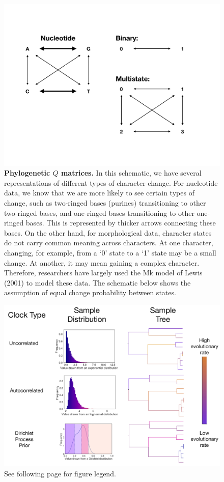 \documentclass[11pt]{article}
\begin{document}
\clearpage

\begin{figure}[h!]
\centering
\includegraphics[width=\textwidth]{figures/Q.pdf}
\caption{\textbf{Phylogenetic $Q$ matrices.}
In this schematic, we have several representations of different types of character change.
For nucleotide data, we know that we are more likely to see certain types of change, such as two-ringed bases (purines) transitioning to other two-ringed bases, and one-ringed bases transitioning to other one-ringed bases.
This is represented by thicker arrows connecting these bases.
On the other hand, for morphological data, character states do not carry common meaning across characters.
At one character, changing, for example, from a `0' state to a `1' state may be a small change.
At another, it may mean gaining a complex character.
Therefore, researchers have largely used the Mk model of Lewis (2001) to model these data.
The schematic below shows the assumption of equal change probability between states.
}
\label{fig:Q}
\end{figure}

\clearpage

\begin{figure}[h!]
\centering
\includegraphics[width=\textwidth]{figures/Distributions.pdf}
\caption{\footnotesize See following page for figure legend.
}
\label{fig:distn}
\end{figure}
\end{document}
